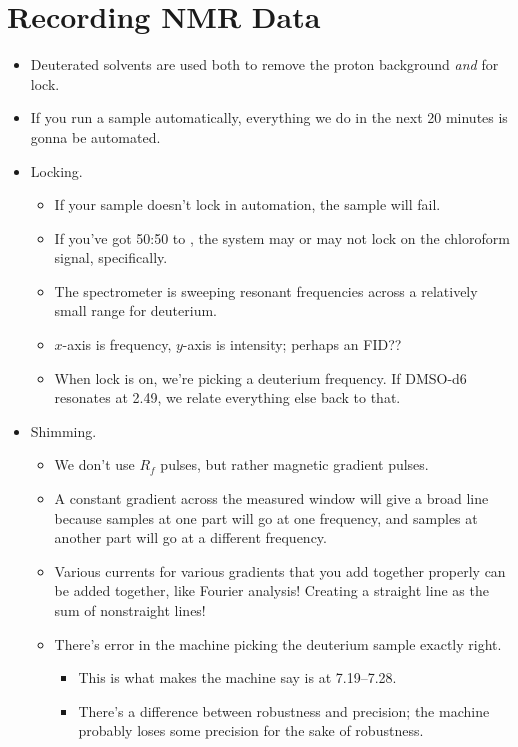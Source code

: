 \documentclass[../notes.tex]{subfiles}
\begin{document}
\section{Recording NMR Data}
\begin{itemize}
    \item {}Deuterated solvents are used both to remove the proton background \emph{and} for lock.
    \item If you run a sample automatically, everything we do in the next 20 minutes is gonna be automated.
    \item Locking.
    \begin{itemize}
        \item If your sample doesn't lock in automation, the sample will fail.
        \item If you've got 50:50  to , the system may or may not lock on the chloroform signal, specifically.
        \item The spectrometer is sweeping resonant frequencies across a relatively small range for deuterium.
        \item $x$-axis is frequency, $y$-axis is intensity; perhaps an FID??
        \item When lock is on, we're picking a deuterium frequency. If DMSO-d6 resonates at \SI{2.49}{\partspermillion}, we relate everything else back to that.
    \end{itemize}
    \item Shimming.
    \begin{itemize}
        \item We don't use $R_f$ pulses, but rather magnetic gradient pulses.
        \item A constant gradient across the measured window will give a broad line because samples at one part will go at one frequency, and samples at another part will go at a different frequency.
        \item Various currents for various gradients that you add together properly can be added together, like Fourier analysis! Creating a straight line as the sum of nonstraight lines!
        \item There's error in the machine picking the deuterium sample exactly right.
        \begin{itemize}
            \item This is what makes the machine say  is at \SIrange{7.19}{7.28}{\partspermillion}.
            \item There's a difference between robustness and precision; the machine probably loses some precision for the sake of robustness.

\end{itemize}
\end{itemize}
\end{itemize}
\end{document}
